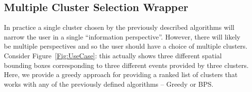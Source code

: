 



\subsection{Multiple Cluster Selection Wrapper}

In practice a single cluster chosen by the previously described algorithms will narrow the user in a single \textquotedblleft information perspective\textquotedblright{}. However, there will likely be multiple perspectives and so the user should have a choice of multiple clusters.  
Consider Figure~\ref{Fig:UseCase}: this actually shows three different spatial bounding boxes corresponding to three different events provided by three clusters.
Here, we provide a greedy approach for providing a ranked list of clusters that works with any of the previously defined algorithms -- Greedy or BPS.%

